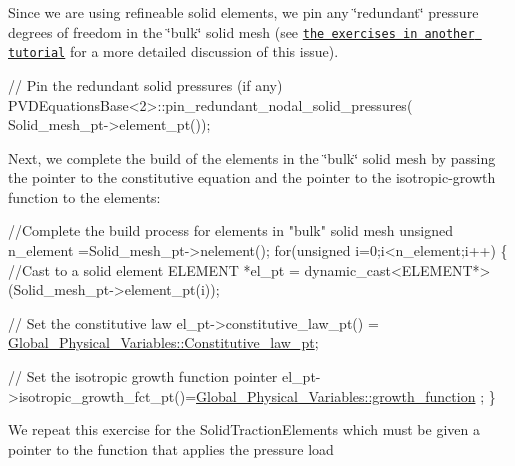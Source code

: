 Since we are using refineable solid elements, we pin any \char`\"{}redundant\char`\"{} pressure degrees of freedom in the \char`\"{}bulk\char`\"{} solid mesh (see \href{../../airy_cantilever/html/index.html#ex}{\tt the exercises in another tutorial} for a more detailed discussion of this issue).


\begin{DoxyCodeInclude}

 \textcolor{comment}{// Pin the redundant solid pressures (if any)}
 PVDEquationsBase<2>::pin\_redundant\_nodal\_solid\_pressures(
  Solid\_mesh\_pt->element\_pt());

\end{DoxyCodeInclude}


Next, we complete the build of the elements in the \char`\"{}bulk\char`\"{} solid mesh by passing the pointer to the constitutive equation and the pointer to the isotropic-\/growth function to the elements\+:


\begin{DoxyCodeInclude}

 \textcolor{comment}{//Complete the build process for elements in "bulk" solid mesh}
 \textcolor{keywordtype}{unsigned} n\_element =Solid\_mesh\_pt->nelement();
 \textcolor{keywordflow}{for}(\textcolor{keywordtype}{unsigned} i=0;i<n\_element;i++)
  \{
   \textcolor{comment}{//Cast to a solid element}
   ELEMENT *el\_pt = \textcolor{keyword}{dynamic\_cast<}ELEMENT*\textcolor{keyword}{>}(Solid\_mesh\_pt->element\_pt(i));
   
   \textcolor{comment}{// Set the constitutive law}
   el\_pt->constitutive\_law\_pt() =
    \hyperlink{namespaceGlobal__Physical__Variables_a2a37fb040c832ee7a086bb13bb02a100}{Global\_Physical\_Variables::Constitutive\_law\_pt};
   
   \textcolor{comment}{// Set the isotropic growth function pointer}
   el\_pt->isotropic\_growth\_fct\_pt()=\hyperlink{namespaceGlobal__Physical__Variables_a6be3760e5494b1772e4bfe5d5f3c5d53}{Global\_Physical\_Variables::growth\_function}
      ;
  \}

\end{DoxyCodeInclude}


We repeat this exercise for the {\ttfamily Solid\+Traction\+Elements} which must be given a pointer to the function that applies the pressure load


